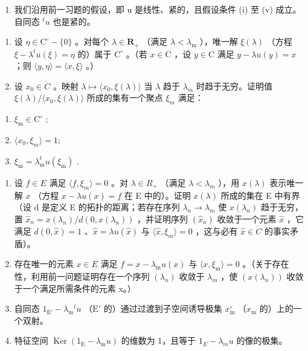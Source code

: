 \begin{enumerate}
\def\labelenumi{\arabic{enumi})}
\setcounter{enumi}{29}
\tightlist
\item
  我们沿用前一习题的假设，即 u 是线性、紧的，且假设条件 (i) 至 (v) 成立。自同态 \(^{t}u\) 也是紧的。
\end{enumerate}

\begin{enumerate}
\def\labelenumi{\alph{enumi})}
\item
  设 \(\eta \in \mathrm{C}^{\circ} - \{0\}\) 。对每个 \(\lambda \in \mathbf{R}_{+}\) （满足 \(\lambda < \lambda_{\mathrm{m}}\) ），唯一解 \(\xi(\lambda)\) （方程 \(\xi - \lambda^{t}u(\xi) = \eta\) 的）属于 \(\mathrm{C}^{\circ}\) 。（若 \(x \in \mathrm{C}\) ，设 \(y \in \mathrm{C}\) 满足 \(y - \lambda u(y) = x\) ；则 \(\langle y, \eta \rangle = \langle x, \xi \rangle\) 。）
\item
  设 \(x_{0} \in \mathring{C}\) 。映射 \(\lambda \mapsto \langle x_{0}, \xi(\lambda) \rangle\) 当 \(\lambda\) 趋于 \(\lambda_{m}\) 时趋于无穷。证明值 \(\xi(\lambda)/\langle x_{0}, \xi(\lambda) \rangle\) 所成的集有一个聚点 \(\xi_{m}\) 满足：
\end{enumerate}

\begin{enumerate}
\def\labelenumi{(\roman{enumi})}
\item
  \(\xi_{\mathrm{m}}\in \mathrm{C}^{\circ}\) ;
\item
  \(\langle x_{0},\xi_{m}\rangle=1;\)
\item
  \(\xi_{\mathrm{m}} = \lambda_{\mathrm{m}}^{t}u(\xi_{\mathrm{m}})\) .
\end{enumerate}

\begin{enumerate}
\def\labelenumi{\alph{enumi})}
\setcounter{enumi}{2}
\item
  设 \(f \in E\) 满足 \(\langle f, \xi_{m} \rangle = 0\) 。对 \(\lambda \in R_{+}\) （满足 \(\lambda < \lambda_{m}\) ），用 \(x(\lambda)\) 表示唯一解 \(x\) （方程 \(x - \lambda u(x) = f\) 在 E 中的）。证明 \(x(\lambda)\) 所成的集在 E 中有界（设 d 是定义 E 的拓扑的距离；若存在序列 \(\lambda_{n} \to \lambda_{m}\) 使 \(x(\lambda_{n})\) 趋于无穷，置 \(\hat{x}_{n} = x(\lambda_{n}) / d(0, x(\lambda_{n}))\) ，并证明序列 \((\hat{x}_{n})\) 收敛于一个元素 \(\hat{x}\) ，它满足 \(d(0, \hat{x}) = 1\) 、\(\hat{x} = \lambda u(\hat{x})\) 与 \(\langle \hat{x}, \xi_{m} \rangle = 0\) ，这与必有 \(\hat{x} \in \mathring{C}\) 的事实矛盾）。
\item
  存在唯一的元素 \(x \in E\) 满足 \(f = x - \lambda_{\mathrm{m}} u(x)\) 与 \(\langle x, \xi_{\mathrm{m}} \rangle = 0\) 。（关于存在性，利用前一问题证明存在一个序列 \((\lambda_{n})\) 收敛于 \(\lambda_{m}\) ，使 \((x(\lambda_{n}))\) 收敛于一个满足所需条件的元素 x。）
\item
  自同态 \(1_{\mathrm{E}'} - \lambda_{\mathrm{m}}{}^{t}u\) （\(\mathrm{E}'\) 的）通过过渡到子空间诱导极集 \(x_{\mathrm{m}}^{\circ}\) （\(x_{\mathrm{m}}\) 的）上的一个双射。
\item
  特征空间 \(\operatorname{Ker}(1_{\mathrm{E}} - \lambda_{\mathrm{m}}u)\) 的维数为 1，且等于 \(1_{E} - \lambda_{m}u\) 的像的极集。
\end{enumerate}

